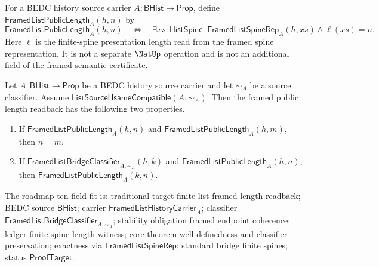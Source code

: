 \begin{definition}
\label{def:framed-list-public-length-readback}
For a BEDC history source carrier $A:\mathsf{BHist}\to\mathsf{Prop}$, define
$\mathsf{FramedListPublicLength}_A(h,n)$ by
$$
\mathsf{FramedListPublicLength}_A(h,n)
\quad\Longleftrightarrow\quad
\exists xs:\mathsf{HistSpine}.\;
\mathsf{FramedListSpineRep}_A(h,xs)\land \ell(xs)=n.
$$
Here $\ell$ is the finite-spine presentation length read from the framed spine
representation. It is not a separate $\NatUp$ operation and is not an additional
field of the framed semantic certificate.
\end{definition}

\begin{theorem}
\label{thm:framed-list-public-length-readback-well-defined}
Let $A:\mathsf{BHist}\to\mathsf{Prop}$ be a BEDC history source carrier and let
$\sim_A$ be a source classifier. Assume
$\mathsf{ListSourceHsameCompatible}(A,\sim_A)$. Then the framed public length
readback has the following two properties.
\begin{enumerate}
  \item If $\mathsf{FramedListPublicLength}_A(h,n)$ and
  $\mathsf{FramedListPublicLength}_A(h,m)$, then $n=m$.
  \item If $\mathsf{FramedListBridgeClassifier}_{A,\sim_A}(h,k)$ and
  $\mathsf{FramedListPublicLength}_A(h,n)$, then
  $\mathsf{FramedListPublicLength}_A(k,n)$.
\end{enumerate}
The roadmap ten-field fit is: traditional target finite-list framed length
readback; BEDC source $\mathsf{BHist}$; carrier
$\mathsf{FramedListHistoryCarrier}_A$; classifier
$\mathsf{FramedListBridgeClassifier}_{A,\sim_A}$; stability obligation framed
endpoint coherence; ledger finite-spine length witness; core theorem
well-definedness and classifier preservation; exactness via
$\mathsf{FramedListSpineRep}$; standard bridge finite spines; status
$\mathsf{ProofTarget}$.
\end{theorem}
